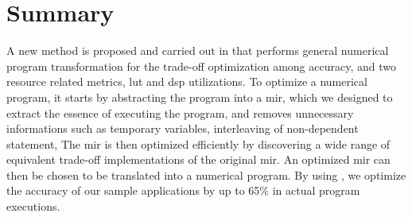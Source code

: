 \section{Summary}
\label{po:sec:conclusion}

A new method is proposed and carried out in \soap{} that performs general
numerical program transformation for the trade-off optimization among accuracy,
and two resource related metrics, \gls{lut} and \gls{dsp} utilizations.  To
optimize a numerical program, it starts by abstracting the program into a
\gls{mir}, which we designed to extract the essence of executing the program,
and removes unnecessary informations such as temporary variables, interleaving
of non-dependent statement, \etc{} The \gls{mir} is then optimized efficiently
by discovering a wide range of equivalent trade-off implementations of the
original \gls{mir}\@.  An optimized \gls{mir} can then be chosen to be
translated into a numerical program.  By using \soap, we optimize the accuracy
of our sample applications by up to 65\% in actual program executions.
